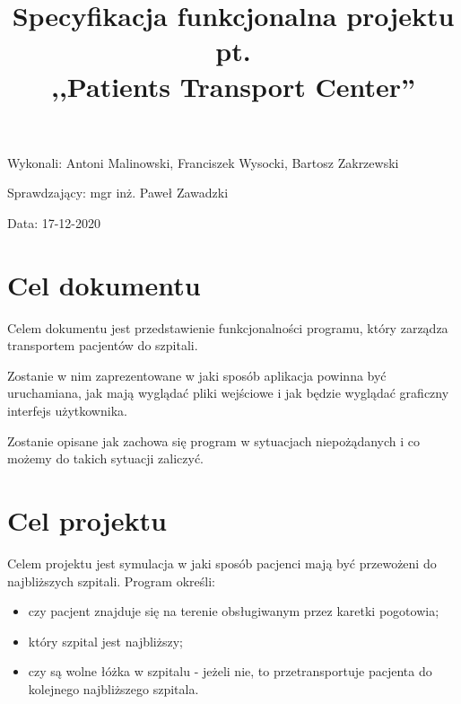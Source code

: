 \documentclass{article}
\title{Specyfikacja funkcjonalna projektu pt. \\ ,,Patients Transport Center''}
\author{}
\date{}
\begin{document}
\maketitle

\begin{flushright}
\par
\vfill
\par
{\fontsize{11}{11}\selectfont
    Wykonali: Antoni Malinowski, Franciszek Wysocki, Bartosz Zakrzewski

    Sprawdzający: mgr inż. Paweł Zawadzki

    Data: 17-12-2020
}
\end{flushright}
\thispagestyle{empty}

\newpage

\tableofcontents

\newpage

\section{Cel dokumentu}
{\fontsize{12}{12}\selectfont
Celem dokumentu jest przedstawienie funkcjonalności programu, który zarządza transportem pacjentów do szpitali.

Zostanie w nim zaprezentowane w jaki sposób aplikacja powinna być uruchamiana, jak mają wyglądać pliki wejściowe i jak będzie wyglądać graficzny interfejs użytkownika.

Zostanie opisane jak zachowa się program w sytuacjach niepożądanych i co możemy do takich sytuacji zaliczyć.
}

\section{Cel projektu}
{\fontsize{12}{12}\selectfont
Celem projektu jest symulacja w jaki sposób pacjenci mają być przewożeni do najbliższych szpitali. 
Program określi:
\begin{itemize}
    \item czy pacjent znajduje się na terenie obsługiwanym przez karetki pogotowia;
    \item który szpital jest najbliższy;
    \item czy są wolne łóżka w szpitalu - jeżeli nie, to przetransportuje pacjenta do kolejnego najbliższego szpitala.
\end{itemize}
}

\clearpage

\end{document}
